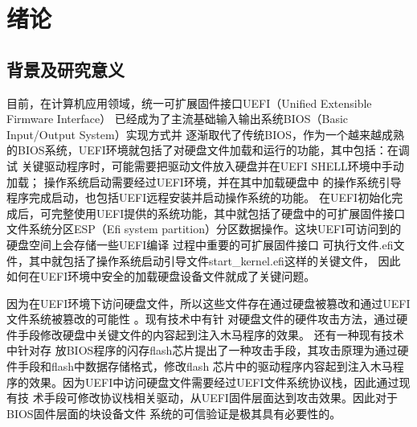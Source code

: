 %
%
\chapter{绪论}
%
%
\section{背景及研究意义}
目前，在计算机应用领域，统一可扩展固件接口UEFI（Unified Extensible Firmware Interface）
已经成为了主流基础输入输出系统BIOS（Basic Input/Output System）实现方式并
逐渐取代了传统BIOS，作为一个越来越成熟的BIOS系统，UEFI环境就包括了对硬盘文件加载和运行的功能，其中包括：在调试
关键驱动程序时，可能需要把驱动文件放入硬盘并在UEFI SHELL环境中手动加载\cite{english16,english20}；
操作系统启动需要经过UEFI环境，并在其中加载硬盘中
的操作系统引导程序完成启动，也包括UEFI远程安装并启动操作系统的功能\cite{chinese29}。
在UEFI初始化完成后，可完整使用UEFI提供的系统功能，其中就包括了硬盘中的可扩展固件接口
文件系统分区ESP（Efi system partition）分区数据操作。这块UEFI可访问到的硬盘空间上会存储一些UEFI编译
过程中重要的可扩展固件接口
可执行文件.efi文件，其中就包括了操作系统启动引导文件start\_kernel.efi这样的关键文件\cite{chinese18}，
因此如何在UEFI环境中安全的加载硬盘设备文件就成了关键问题。
\par 因为在UEFI环境下访问硬盘文件，所以这些文件存在通过硬盘被篡改和通过UEFI文件系统被篡改的可能性
\cite{chinese16}。现有技术中有针
对硬盘文件的硬件攻击方法\cite{english5}，通过硬件手段修改硬盘中关键文件的内容起到注入木马程序的效果。
还有一种现有技术中针对存
放BIOS程序的闪存flash芯片提出了一种攻击手段，其攻击原理为通过硬件手段和flash中数据存储格式，修改flash
芯片中的驱动程序内容起到注入木马程序的效果。因为UEFI中访问硬盘文件需要经过UEFI文件系统协议栈，因此通过现有技
术手段可修改协议栈相关驱动\cite{english3}，从UEFI固件层面达到攻击效果。因此对于BIOS固件层面的块设备文件
系统的可信验证是极其具有必要性的\cite{english17,english6,english7}。

%
%
